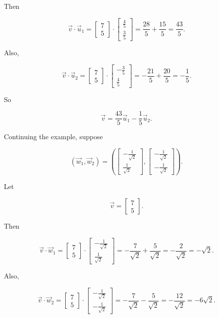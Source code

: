 Then

\[
\vec v\cdot \vec u_1
=
\begin{bmatrix}
7\\
5
\end{bmatrix}
\cdot
\begin{bmatrix}
\frac45\\[2pt]
\frac35
\end{bmatrix}
=
\frac{28}{5}+\frac{15}{5}
=
\frac{43}{5}.
\]

Also,

\[
\vec v\cdot \vec u_2
=
\begin{bmatrix}
7\\
5
\end{bmatrix}
\cdot
\begin{bmatrix}
-\frac35\\[2pt]
\frac45
\end{bmatrix}
=
-\frac{21}{5}+\frac{20}{5}
=
-\frac15.
\]

So

\[
\vec v
=
\frac{43}{5}\vec u_1
-
\frac15 \vec u_2.
\]


Continuing the example, suppose

\[
(\vec w_1,\vec w_2)
=
\left(
\begin{bmatrix}
-\frac{1}{\sqrt{2}}\\[2pt]
\frac{1}{\sqrt{2}}
\end{bmatrix},
\begin{bmatrix}
-\frac{1}{\sqrt{2}}\\[2pt]
-\frac{1}{\sqrt{2}}
\end{bmatrix}
\right).
\]

Let

\[
\vec v=
\begin{bmatrix}
7\\
5
\end{bmatrix}.
\]

Then

\[
\vec v\cdot \vec w_1
=
\begin{bmatrix}
7\\
5
\end{bmatrix}
\cdot
\begin{bmatrix}
-\frac{1}{\sqrt{2}}\\[2pt]
\frac{1}{\sqrt{2}}
\end{bmatrix}
=
-\frac{7}{\sqrt{2}}+\frac{5}{\sqrt{2}}
=
-\frac{2}{\sqrt{2}}
=
-\sqrt{2}.
\]

Also,

\[
\vec v\cdot \vec w_2
=
\begin{bmatrix}
7\\
5
\end{bmatrix}
\cdot
\begin{bmatrix}
-\frac{1}{\sqrt{2}}\\[2pt]
-\frac{1}{\sqrt{2}}
\end{bmatrix}
=
-\frac{7}{\sqrt{2}}-\frac{5}{\sqrt{2}}
=
-\frac{12}{\sqrt{2}}
=
-6\sqrt{2}.
\]

